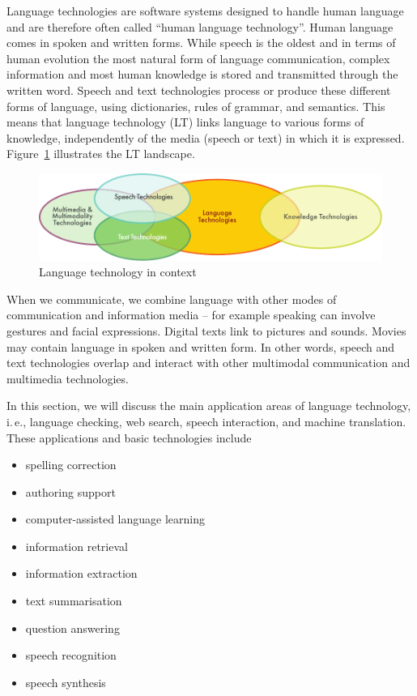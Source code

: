 \documentclass[]{../../metanetpaper}
\begin{document}
\begin{multicols}{2}

Language technologies are software systems designed to handle human language and are therefore often called ``human language technology''. Human language comes in spoken and written forms. While speech is the oldest and in terms of human evolution the most natural form of language communication, complex information and most human knowledge is stored and transmitted through the written word. Speech and text technologies process or produce these different forms of language, using dictionaries, rules of grammar, and semantics. This means that language technology (LT) links language to various forms of knowledge, independently of the media (speech or text) in which it is expressed. Figure~\ref{fig:ltincontext_en} illustrates the LT landscape.

\begin{figure}[htb]
  \center
  \includegraphics[width=\textwidth]{../_media/english/language_technologies}
  \caption{Language technology in context}
  \label{fig:ltincontext_en}
\end{figure}

When we communicate, we combine language with other modes of communication and information media – for example speaking can involve gestures and facial expressions. Digital texts link to pictures and sounds. Movies may contain language in spoken and written form. In other words, speech and text technologies overlap and interact with other multimodal communication and multimedia technologies.

In this section, we will discuss the main application areas of language technology, i.\,e., language checking, web search, speech interaction, and machine translation. These applications and basic technologies include 

\begin{itemize}
\item spelling correction
\item authoring support
\item computer-assisted language learning
\item information retrieval 
\item information extraction
\item text summarisation
\item question answering
\item speech recognition 
\item speech synthesis 
\end{itemize}


\end{multicols}
\end{document}
